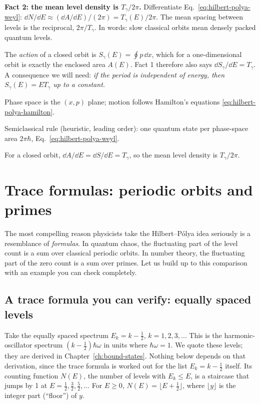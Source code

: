 \textbf{Fact 2: the mean level density is $T_\gamma/2\pi$.} Differentiate Eq.~\eqref{eq:hilbert-polya-weyl}: $\dd N/\dd E\approx(\dd A/\dd E)/(2\pi)=T_\gamma(E)/2\pi$. The mean spacing between levels is the reciprocal, $2\pi/T_\gamma$. In words: slow classical orbits mean densely packed quantum levels.

The \emph{action} of a closed orbit is $S_\gamma(E)=\oint p\,\dd x$, which for a one-dimensional orbit is exactly the enclosed area $A(E)$. Fact 1 therefore also says $\dd S_\gamma/\dd E=T_\gamma$. A consequence we will need: \emph{if the period is independent of energy, then $S_\gamma(E)=ET_\gamma$ up to a constant.}

\begin{keyideas}
\item Phase space is the $(x,p)$ plane; motion follows Hamilton's equations \eqref{eq:hilbert-polya-hamilton}.
\item Semiclassical rule (heuristic, leading order): one quantum state per phase-space area $2\pi\hbar$, Eq.~\eqref{eq:hilbert-polya-weyl}.
\item For a closed orbit, $\dd A/\dd E=\dd S/\dd E=T_\gamma$, so the mean level density is $T_\gamma/2\pi$.
\end{keyideas}

\section{Trace formulas: periodic orbits and primes}\label{sec:hilbert-polya-trace}

The most compelling reason physicists take the Hilbert--P\'olya idea seriously is a resemblance of \emph{formulas}. In quantum chaos, the fluctuating part of the level count is a sum over classical periodic orbits. In number theory, the fluctuating part of the zero count is a sum over primes. Let us build up to this comparison with an example you can check completely.

\subsection{A trace formula you can verify: equally spaced levels}

Take the equally spaced spectrum $E_k=k-\tfrac12$, $k=1,2,3,\dots$ This is the harmonic-oscillator spectrum $(k-\tfrac12)\hbar\omega$ in units where $\hbar\omega=1$. We quote these levels; they are derived in Chapter~\ref{ch:bound-states}. Nothing below depends on that derivation, since the trace formula is worked out for the list $E_k=k-\tfrac12$ itself. Its counting function $N(E)$, the number of levels with $E_k\le E$, is a staircase that jumps by 1 at $E=\tfrac12,\tfrac32,\tfrac52,\dots$ For $E\ge0$, $N(E)=\lfloor E+\tfrac12\rfloor$, where $\lfloor y\rfloor$ is the integer part (``floor'') of $y$.

